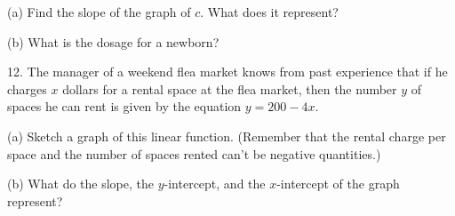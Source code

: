 \documentclass{sebase}
\begin{document}
\begin{multicols}{2}
\begin{ExerciseList}
\begin{ExerciseList}
\item[(a)] Find the slope of the graph of $c$. What does it represent?
\end{ExerciseList}

%

\begin{ExerciseList}
\item[(b)] What is the dosage for a newborn?
\end{ExerciseList}

%

%

\item[12.] The manager of a weekend flea market knows from past experience
that if he charges $x$ dollars for a rental space at the flea market, then
the number $y$ of spaces he can rent is given by the equation $y=200-4x$.%
\vspace{-2pt}

\begin{ExerciseList}
\item[(a)] Sketch a graph of this linear function. (Remember that the rental
charge per space and the number of spaces rented can't be negative
quantities.)

%

\item[(b)] What do the slope, the $y$-intercept, and the $x$-intercept of
the graph represent?

%
\end{ExerciseList}


\end{ExerciseList}
\end{multicols}
\end{document}

